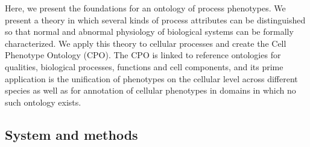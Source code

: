 \documentclass{bioinfo}
\renewcommand{\cite}{\citep}
\begin{document}
Here, we present the foundations for an ontology of process
phenotypes. We present a theory in which several kinds of process
attributes can be distinguished so that normal and abnormal physiology
of biological systems can be formally characterized. We apply this
theory to cellular processes and create the Cell Phenotype Ontology
(CPO). The CPO is linked to reference ontologies for qualities,
biological processes, functions and cell components, and its prime
application is the unification of phenotypes on the cellular level
across different species as well as for annotation of cellular
phenotypes in domains in which no such ontology exists.


\begin{methods}
\section{System and methods}



\end{methods}
\end{document}
